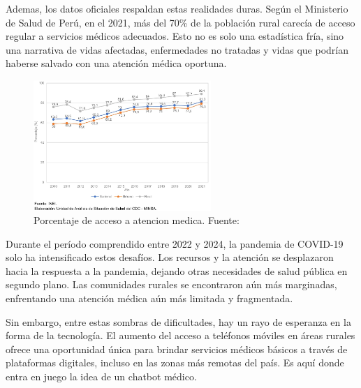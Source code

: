 Ademas, los datos oficiales respaldan estas realidades duras. Según el Ministerio de Salud de Perú, en el 2021, más del 70\% de la población rural carecía de acceso regular a servicios médicos adecuados. Esto no es solo una estadística fría, sino una narrativa de vidas afectadas, enfermedades no tratadas y vidas que podrían haberse salvado con una atención médica oportuna.

\begin{figure}[h]
	\begin{center}
		\includegraphics[width=0.6\textwidth]{1/figures/MINSA.jpeg}
		\caption{Porcentaje de acceso a atencion medica. Fuente: \cite{gl_inei}}
		\label{2:fig}
	\end{center}
\end{figure}

Durante el período comprendido entre 2022 y 2024, la pandemia de COVID-19 solo ha intensificado estos desafíos. Los recursos y la atención se desplazaron hacia la respuesta a la pandemia, dejando otras necesidades de salud pública en segundo plano. Las comunidades rurales se encontraron aún más marginadas, enfrentando una atención médica aún más limitada y fragmentada.

Sin embargo, entre estas sombras de dificultades, hay un rayo de esperanza en la forma de la tecnología. El aumento del acceso a teléfonos móviles en áreas rurales ofrece una oportunidad única para brindar servicios médicos básicos a través de plataformas digitales, incluso en las zonas más remotas del país. Es aquí donde entra en juego la idea de un chatbot médico.

